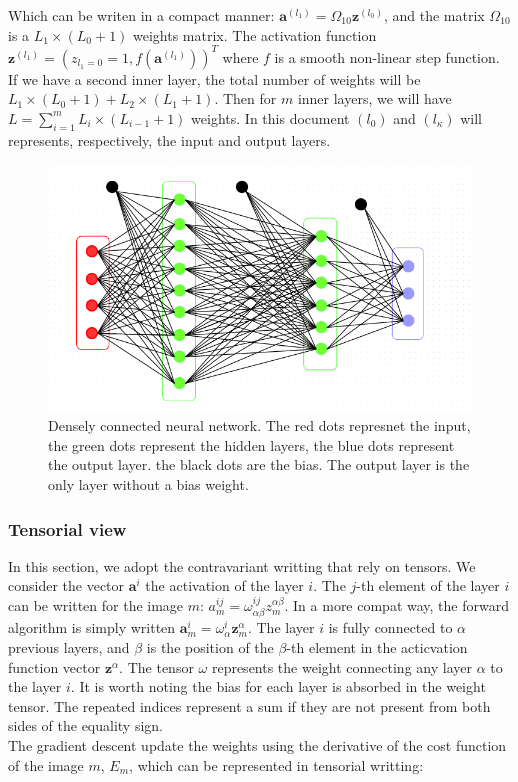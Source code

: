 \documentclass[final, paper=letter,5p,times,twocolumn]{elsarticle}
\begin{document}
Which can be writen in a compact manner: $\bm{a}^{(l_{1})} = \Omega_{10}\bm{z}^{(l_{0})}$, and the matrix $\Omega_{10}$ is a $L_{1}\times(L_{0}+1)$ weights matrix. The activation function $\bm{z}^{(l_{1})} = (z_{l_{1} = 0} = 1, f(\bm{a}^{(l_{1})}))^{T}$ where $f$ is a smooth non-linear step function. If we have a second inner layer, the total number of weights will be $L_{1}\times(L_{0}+1) + L_{2}\times(L_{1}+1)$. Then for $m$ inner layers, we will have $L = \sum_{i = 1}^{m}L_{i}\times(L_{i-1}+1)$ weights. In this document $(l_{0})$ and $(l_{\kappa})$ will represents, respectively, the input and output layers.\\


\begin{figure}[htbp]
   \begin{center}
      \includegraphics[scale=0.3, angle=0]{images/densely_connected_nn.png}
   \end{center}
   \caption{Densely connected neural network. The red dots represnet the input, the green dots represent the hidden layers, the blue dots represent the output layer. the black dots are the bias. The output layer is the only layer without a bias weight.}
  \label{fig:Densely_connected_neural_network} 
\end{figure}


\subsubsection{Tensorial view}

In this section, we adopt the contravariant writting that rely on tensors. We consider the vector $\bm{a}^{i}$ the activation of the layer $i$. The $j$-th element of the layer $i$ can be written for the image $m$: $a_{m}^{ij} = \omega_{\alpha \beta}^{ij}z_{m}^{\alpha \beta}$. In a more compat way, the forward algorithm is simply written $\bm{a}_{m}^{i} = \omega_{\alpha}^{i}\bm{z}_{m}^{\alpha}$. The layer $i$ is fully connected to $\alpha$ previous layers, and $\beta$ is the position of the $\beta$-th element in the acticvation function vector $\bm{z}^{\alpha}$. The tensor $\omega$ represents the weight connecting any layer $\alpha$ to the layer $i$. It is worth noting the bias for each layer is absorbed in the weight tensor. The repeated indices represent a sum if they are not present from both sides of the equality sign. \\
The gradient descent update the weights using the derivative of the cost function of the image $m$, $E_{m}$, which can be represented in tensorial writting:
\end{document}
